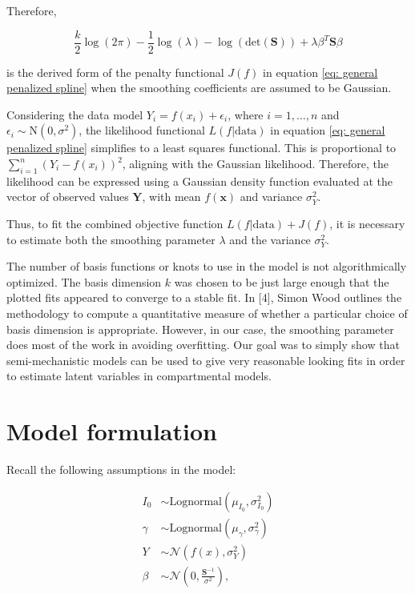 \documentclass[
11pt, %
oneside, %
english, %
singlespacing, %
]{macthesis} %
\begin{document}
Therefore,

\begin{equation}
\frac{k}{2} \log(2\pi) - \frac{1}{2} \log(\lambda) -  \log(\text{det}(\mathbf{S})) + \lambda \beta^T \mathbf{S} \beta
\label{eq:obj eqn}
\end{equation}

is the derived form of the penalty functional \(J(f)\) in equation \ref{eq: general penalized spline} when the smoothing coefficients are assumed to be Gaussian.

Considering the data model \(Y_i = f(x_i) + \epsilon_i\), where \(i = 1, \dots, n\) and \(\epsilon_i \sim \text{N}(0, \sigma^2)\), the likelihood functional \(L(f|\text{data})\) in equation \ref{eq: general penalized spline} simplifies to a least squares functional. This is proportional to \(\sum_{i=1}^n (Y_i - f(x_i))^2\), aligning with the Gaussian likelihood. Therefore, the likelihood can be expressed using a Gaussian density function evaluated at the vector of observed values \(\mathbf{Y}\), with mean \(f(\mathbf{x})\) and variance \(\sigma^2_Y\).

Thus, to fit the combined objective function \(L(f|\text{data}) + J(f)\), it is necessary to estimate both the smoothing parameter \(\lambda\) and the variance \(\sigma^2_Y\).

The number of basis functions or knots to use in the model is not algorithmically optimized. The basis dimension \(k\) was chosen to be just large enough that the plotted fits appeared to converge to a stable fit. In {[}4{]}, Simon Wood outlines the methodology to compute a quantitative measure of whether a particular choice of basis dimension is appropriate. However, in our case, the smoothing parameter does most of the work in avoiding overfitting. Our goal was to simply show that semi-mechanistic models can be used to give very reasonable looking fits in order to estimate latent variables in compartmental models.

\section{Model formulation}\label{Model-formulation}

Recall the following assumptions in the model:

\[
\begin{aligned}
I_0 &\sim \text{Lognormal}(\mu_{I_0}, \sigma^2_{I_0}) \\
\gamma &\sim \text{Lognormal}(\mu_{\gamma}, \sigma^2_{\gamma}) \\
Y &\sim \mathcal{N}(f(x), \sigma^2_Y) \\
\beta &\sim \mathcal{N}(0, \frac{\mathbf{S}^{-1}}{\sigma^2}),
\end{aligned}
\]
\end{document}
